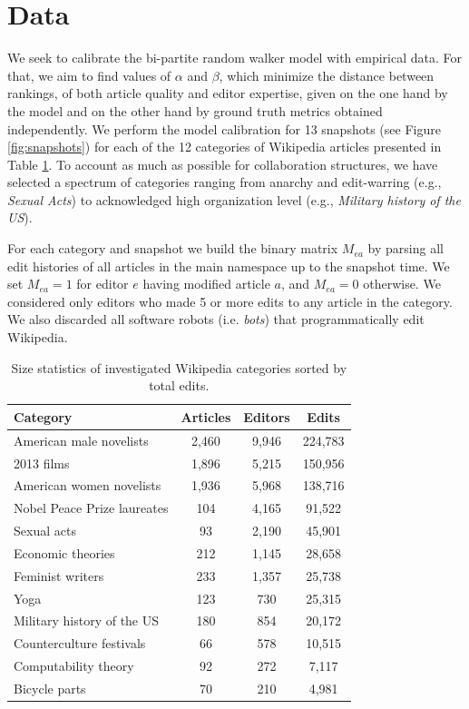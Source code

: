 \section{Data}
We seek to calibrate the bi-partite random walker model with empirical data. For that, we aim to find values of $\alpha$ and $\beta$, which minimize the distance between rankings, of both article quality and editor expertise, given on the one hand by the model and on the other hand by ground truth metrics obtained independently. We perform the model calibration for 13 snapshots (see Figure \ref{fig:snapshots})  for each of  the 12 categories of Wikipedia articles presented in Table \nolinebreak \ref{tab:statistics}. To account as much as possible for collaboration structures, we have selected a spectrum of categories ranging from anarchy and edit-warring (e.g., {\it Sexual Acts}) to acknowledged high organization level (e.g., {\it Military history of the US}).

For each category and snapshot we build the binary matrix $M_{ea}$ by parsing all edit histories of all articles in the main namespace up to the snapshot time. We set $M_{ea} = 1$ for editor $e$ having modified article $a$, and $M_{ea} = 0$ otherwise. We considered only editors who made 5 or more edits to any article in the category. We also discarded all software robots (i.e. {\it bots}) that programmatically edit Wikipedia. 

\begin{table}
\begin{tabular}{|l|c|c|c|}
\hline
{\bf Category} &  {\bf Articles} &  {\bf Editors} &  {\bf Edits} \\
\hline
American male novelists               &      2,460 &   9,946 &  224,783 \\
2013 films                            &      1,896 &   5,215 &  150,956 \\
American women novelists              &      1,936 &   5,968 &  138,716 \\
Nobel Peace Prize laureates           &       104 &   4,165 &   91,522 \\
Sexual acts                           &        93 &   2,190 &   45,901 \\
Economic theories                     &       212 &   1,145 &   28,658 \\
Feminist writers                      &       233 &   1,357 &   25,738 \\
Yoga                                  &       123 &    730 &   25,315 \\
Military history of the US &       180 &    854 &   20,172 \\
Counterculture festivals              &        66 &    578 &   10,515 \\
Computability theory                  &        92 &    272 &    7,117 \\
Bicycle parts                         &        70 &    210 &    4,981 \\
\hline
\end{tabular}
\caption{Size statistics of investigated Wikipedia categories sorted by total edits.}
\label{tab:statistics}
\end{table}

